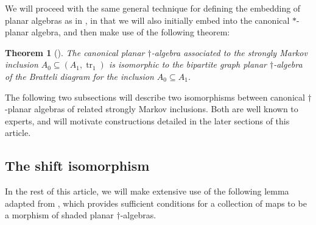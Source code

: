 \documentclass[11pt]{article}
\theoremstyle{plain}
\newtheorem{thm}{Theorem}[section]
\theoremstyle{definition}
\DeclareMathOperator{\tr}{tr}
\begin{document}
We will proceed with the same general technique for defining the embedding of planar algebras as in \cite{MR2812459}, in that we will also initially embed into the canonical $\ast$-planar algebra, and then make use of the following theorem:

\begin{thm}[{\cite[Theorem 3.28]{MR2812459}}] \label{planaralgebraisomorphism}
The canonical planar $\dag$-algebra associated to the strongly Markov inclusion $A_0\subseteq (A_1,\tr_1)$ is isomorphic to the bipartite graph planar $\dag$-algebra of the Bratteli diagram for the inclusion $A_0\subseteq A_1$.
\end{thm}

The following two subsections will describe two isomorphisms between canonical $\dag$-planar algebras of related strongly Markov inclusions. Both are well known to experts, and will motivate constructions detailed in the later sections of this article.

\subsection{The shift isomorphism} 
\label{ssec:shift}

In the rest of this article, we will make extensive use of the following lemma adapted from \cite[Lem.~2.49]{MR2812459}, which provides sufficient conditions for a collection of maps to be a morphism of shaded planar $\dag$-algebras.
\end{document}
